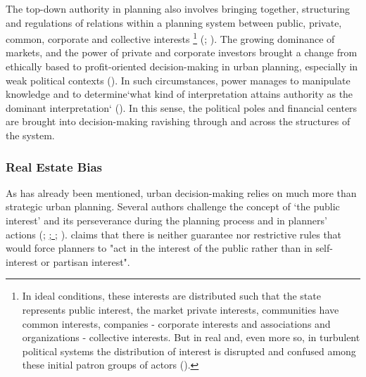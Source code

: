 \documentclass[11pt]{report}
\begin{document}
{{{The top-down authority in planning also involves bringing together, structuring and regulations of relations within a planning system between public, private, common, corporate and collective interests
\footnote{In ideal conditions, these interests are distributed such that the state represents public interest, the market private interests, communities have common interests, companies - corporate interests and associations and organizations - collective interests. But in real and, even more so, in turbulent political systems the distribution of interest is disrupted and confused among these initial patron groups of actors (\href{Vujosevic}{\citealt{vujosevic_regionalizam_2015}}).}
(\href{Maksic}{\citealt{maksic_european_2012}}; \href{Vujosevic}{\citealt{vujosevic_regionalizam_2015}}).
The growing dominance of markets, and the power of private and corporate investors brought a change from ethically based to profit-oriented decision-making in urban planning, especially in weak political contexts (\href{Lazarevic}{\citealt{bajec_rational_2009}}).
In such circumstances, power manages to manipulate knowledge and to determine`what kind of interpretation attains authority as the dominant interpretation` (\href{Getimis}{\citealt{getimis_comparing_2012}}).
In this sense, the political poles and financial centers are brought into decision-making ravishing through and across the structures of the system.

\subsubsection{Real Estate Bias}

As has already been mentioned, urban decision-making relies on much more than strategic urban planning.
Several authors challenge the concept of ‘the public interest’ and its perseverance during the planning process and in planners' actions
(\href{Alexander}{\citealt{alexander_XXX_2002}};
\href{Campbell}{{\citealt{campbel_XXX_2012}};
\href{Moroni}{\citealt{moroni_XXXX_2004}}};
\href{Sager}{\citealt{sager_logic_2006}}). 
\href{Sager}{\cite{sager_logic_2006}} claims that there is neither guarantee nor restrictive rules that would force planners to "act in the interest of the public rather than in self-interest or partisan interest".
\\

}}}
\end{document}
